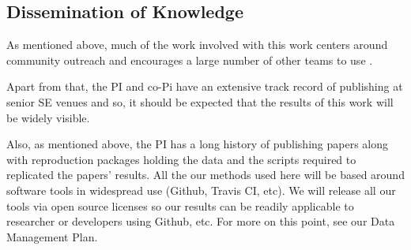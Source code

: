 


%
\subsection{Dissemination of Knowledge}
As mentioned above, much of the work involved with this work centers around community outreach and encourages a large number of other teams to use {\IT}.

Apart from that, the PI and co-Pi have  an extensive track record of publishing at senior SE venues and so, it should be expected that the results of this work will be widely visible.

Also, as mentioned above, the PI has a long history of publishing papers along with reproduction packages holding the data and the scripts required to replicated the papers' results. 
All the our methods used here will be based around software tools in widespread   use (Github, Travis CI, etc). 
We will release all our tools via open source licenses so our results can be readily applicable to researcher or developers using Github, etc.
For more on this point, see our Data Management Plan.
\vspace{8pt}